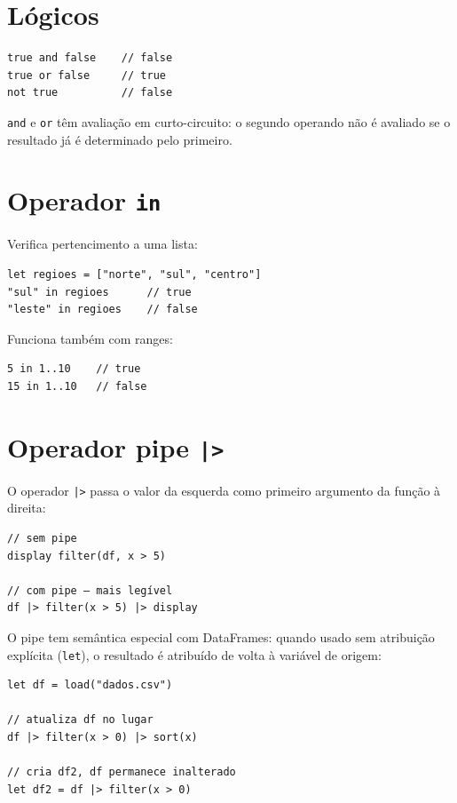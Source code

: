 \section{Lógicos}

\begin{lstlisting}
true and false    // false
true or false     // true
not true          // false
\end{lstlisting}

\lstinline{and} e \lstinline{or} têm avaliação em curto-circuito: o segundo
operando não é avaliado se o resultado já é determinado pelo primeiro.

\section{Operador \texttt{in}}

Verifica pertencimento a uma lista:

\begin{lstlisting}
let regioes = ["norte", "sul", "centro"]
"sul" in regioes      // true
"leste" in regioes    // false
\end{lstlisting}

Funciona também com ranges:

\begin{lstlisting}
5 in 1..10    // true
15 in 1..10   // false
\end{lstlisting}

\section{Operador pipe \texttt{|>}}
\label{sec:pipe}

O operador \lstinline{|>} passa o valor da esquerda como primeiro argumento da
função à direita:

\begin{lstlisting}
// sem pipe
display filter(df, x > 5)

// com pipe — mais legível
df |> filter(x > 5) |> display
\end{lstlisting}

O pipe tem semântica especial com DataFrames: quando usado sem atribuição explícita
(\lstinline{let}), o resultado é atribuído de volta à variável de origem:

\begin{lstlisting}
let df = load("dados.csv")

// atualiza df no lugar
df |> filter(x > 0) |> sort(x)

// cria df2, df permanece inalterado
let df2 = df |> filter(x > 0)
\end{lstlisting}

